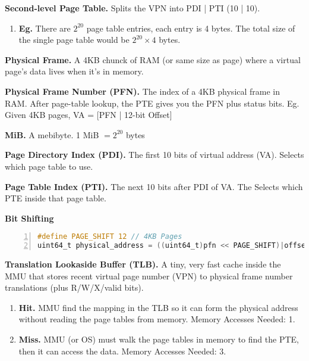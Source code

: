 \documentclass[12pt]{article}
\begin{document}
    {\bf Second-level Page Table.} {Splits the VPN into PDI | PTI (10 | 10).} \par

    \begin{enumerate}
        \item[]{\bf Eg.} {There are $2^{20}$ page table entries, each entry is 4 bytes. The total size of the single page table would be $2^{20} \times 4$ bytes.} \par
    \end{enumerate}

\vspace{1em}

    {\bf Physical Frame.} {A 4KB chunck of RAM (or same size as page) where a virtual page's data lives when it's in memory.} 

    {\bf Physical Frame Number (PFN).} {The index of a 4KB physical frame in RAM. After page-table lookup, the PTE gives you the PFN plus status bits. Eg. Given 4KB pages, VA = [PFN | 12-bit Offset]}

    {\bf MiB.} {A mebibyte. 1 MiB $= 2^{20}$ bytes} 

    {\bf Page Directory Index (PDI).} {The first 10 bits of virtual address (VA). Selects which page table to use.} \par

    {\bf Page Table Index (PTI).} {The next 10 bits after PDI of VA. The Selects which PTE inside that page table.} \par
 




{\bf Bit Shifting} \par
\begin{lstlisting}[language=C, numbers=left, basicstyle=\ttfamily]
#define PAGE_SHIFT 12 // 4KB Pages
uint64_t physical_address = ((uint64_t)pfn << PAGE_SHIFT)|offset; 

\end{lstlisting}

{\bf Translation Lookaside Buffer (TLB).} {A tiny, very fast cache inside the MMU that stores recent virtual page number (VPN) to physical frame number translations (plus R/W/X/valid bits).} \par
\begin{enumerate}
        \item[]{\bf Hit.} {MMU find the mapping in the TLB so it can form the physical address without reading the page tables from memory. Memory Accesses Needed: 1.}
        \item[]{\bf Miss.} {MMU (or OS) must walk the page tables in memory to find the PTE, then it can access the data. Memory Accesses Needed: 3. } 
\end{enumerate}
\end{document}
